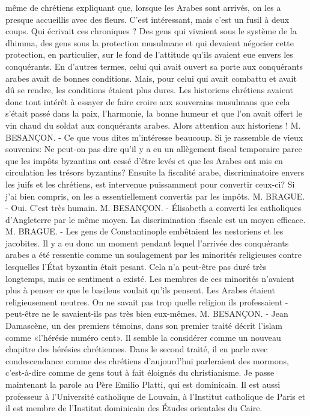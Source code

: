 même de chrétiens expliquant que, lorsque les Arabes sont arrivés, on les a presque accueillis avec des fleurs. C'est intéressant, mais c'est un fusil à deux coups.
Qui écrivait ces chroniques ? Des gens qui vivaient sous le système de la dhimma, des gens sous la protection musulmane et qui devaient négocier cette protection, en particulier, sur le fond de l'attitude qu'ils avaient eue envers les conquérants. En d'autres termes, celui qui avait ouvert sa porte aux conquérants arabes avait de bonnes conditions. Mais, pour celui qui avait combattu et avait dû se rendre, les conditions étaient plus dures. Les historiens chrétiens avaient donc tout intérêt à essayer de faire croire aux souverains musulmans que cela s'était passé dans la paix, l'harmonie, la bonne humeur et que l'on avait offert le vin chaud du soldat aux conquérants arabes. Alors attention aux historiens !
\newline M. BESANÇON. - Ce que vous dites m'intéresse beaucoup. Si je rassemble de vieux souvenirs: Ne peut-on pas dire qu'il y a eu un allègement fiscal temporaire parce que les impôts byzantins ont cessé d'être levés et que les Arabes ont mis en circulation les trésors byzantins? Ensuite la fiscalité arabe, discriminatoire envers les juifs et les chrétiens, est intervenue puissamment pour convertir ceux-ci? Si j'ai bien compris, on les a essentiellement convertis par les impôts.
\newline M. BRAGUE. -  Oui. C'est très humain.
\newline M. BESANÇON. - Élisabeth a converti les catholiques d'Angleterre par le même moyen. La discrimination :fiscale est un moyen efficace.
\newline M. BRAGUE. - Les gens de Constantinople embêtaient les nestoriens et les jacobites. Il y a eu donc un moment pendant lequel l'arrivée des conquérants arabes a été ressentie comme un soulagement par les minorités religieuses contre lesquelles l'État byzantin était pesant. Cela n'a peut-être pas duré très longtemps, mais ce sentiment a existé. Les membres de ces minorités n'avaient plus à penser ce que le basileus voulait qu'ils pensent. Les Arabes étaient religieusement neutres. On ne savait pas trop quelle religion ils professaient - peut-être ne le savaient-ils pas très bien eux-mêmes.
\newline M. BESANÇON. - Jean Damascène, un des premiers témoins, dans son premier traité décrit l'islam comme «l'hérésie numéro cent». Il semble la considérer comme un nouveau chapitre des hérésies chrétiennes. Dans le second traité, il en parle avec condescendance comme des chrétiens d'aujourd'hui parleraient des mormons, c'est-à-dire comme de gens tout à fait éloignés du christianisme.
Je passe maintenant la parole au Père Emilio Platti, qui est dominicain. Il est aussi professeur à l'Université catholique de Louvain, à l'Institut catholique de Paris et il est membre de l'Institut dominicain des Études orientales du Caire.


